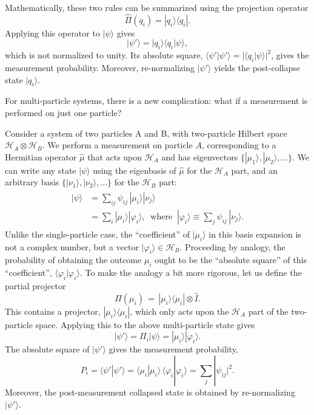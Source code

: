 \documentclass[pra,12pt]{revtex4}
\begin{document}
Mathematically, these two rules can be summarized using the projection
operator
\begin{equation}
  \hat{\Pi}(q_i) = |q_i\rangle\langle q_i|.
\end{equation}
Applying this operator to $|\psi\rangle$ gives
\begin{equation}
  |\psi'\rangle = |q_i\rangle \langle q_i|\psi\rangle,
\end{equation}
which is not normalized to unity.  Its absolute square,
$\langle\psi'|\psi'\rangle = |\langle q_i|\psi\rangle|^2$, gives the
measurement probability.  Moreover, re-normalizing $|\psi'\rangle$
yields the post-collapse state $|q_i\rangle$.

For multi-particle systems, there is a new complication: what if a
measurement is performed on just one particle?

Consider a system of two particles A and B, with two-particle Hilbert
space $\mathscr{H}_A \otimes \mathscr{H}_B$.  We perform a measurement
on particle $A$, corresponding to a Hermitian operator $\hat{\mu}$
that acts upon $\mathscr{H}_A$ and has eigenvectors $\{|\mu_1\rangle,
|\mu_2\rangle,\dots\}$.  We can write any state $|\psi\rangle$ using
the eigenbasis of $\hat{\mu}$ for the $\mathscr{H}_A$ part, and an
arbitrary basis $\{|\nu_1\rangle, |\nu_2\rangle,\dots\}$ for the
$\mathscr{H}_B$ part:
\begin{align}
  \begin{aligned}|\psi\rangle &= \sum_{ij} \psi_{ij}\, |\mu_i\rangle |\nu_j\rangle \\&= \sum_i |\mu_i\rangle |\varphi_i\rangle, \;\;\mathrm{where}\;\;|\varphi_i\rangle\equiv \sum_j \psi_{ij}\,|\nu_j\rangle.\end{aligned}
\end{align}
Unlike the single-particle case, the ``coefficient'' of
$|\mu_i\rangle$ in this basis expansion is not a complex number, but a
vector $|\varphi_i\rangle \in \mathscr{H}_B$.  Proceeding by analogy,
the probability of obtaining the outcome $\mu_i$ ought to be the
``absolute square'' of this ``coefficient'',
$\langle\varphi_i|\varphi_i\rangle$.  To make the analogy a bit more
rigorous, let us define the partial projector
\begin{equation}
  \hat{\Pi}(\mu_i) \,=\, |\mu_i\rangle\langle \mu_i| \otimes  \hat{I}.
\end{equation}
This contains a projector, $|\mu_i\rangle\langle \mu_i|$, which only
acts upon the $\mathscr{H}_A$ part of the two-particle space.
Applying this to the above multi-particle state gives
\begin{equation}
  |\psi'\rangle = \Pi_i |\psi\rangle = |\mu_i\rangle |\varphi_i\rangle.
\end{equation}
The absolute square of $|\psi'\rangle$ gives the measurement
probability,
\begin{equation}
  P_i = \langle\psi'|\psi'\rangle = \langle \mu_i|\mu_i\rangle\, \langle \varphi_i|\varphi_i\rangle = \sum_j |\psi_{ij}|^2.
\end{equation}
Moreover, the post-measurement collapsed state is obtained by
re-normalizing $|\psi'\rangle$.
\end{document}

